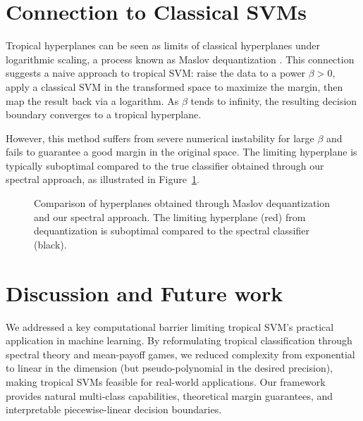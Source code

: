 \documentclass{article}
\begin{document}
\newpage
\section{Connection to Classical SVMs}\label{sec:maslov}
Tropical hyperplanes can be seen as limits of classical hyperplanes under logarithmic scaling, a process known as Maslov dequantization \cite{viro2001}. This connection suggests a naive approach to tropical SVM: raise the data to a power $\beta > 0$, apply a classical SVM in the transformed space to maximize the margin, then map the result back via a logarithm. As $\beta$ tends to infinity, the resulting decision boundary converges to a tropical hyperplane.

However, this method suffers from severe numerical instability for large $\beta$ and fails to guarantee a good margin in the original space. The limiting hyperplane is typically suboptimal compared to the true classifier obtained through our spectral approach, as illustrated in Figure~\ref{fig:maslov_dequantization}.

\begin{figure}[h]
    \centering
    \resizebox{0.5\textwidth}{!}{\clipbox{0.15\width{} 0.15\height{} 0.15\width{} 0.15\height{}}{}}
    \caption{Comparison of hyperplanes obtained through Maslov dequantization and our spectral approach. The limiting hyperplane (red) from dequantization is suboptimal compared to the spectral classifier (black).}
    \label{fig:maslov_dequantization}
\end{figure}

\section{Discussion and Future work}\label{sec:discussion}

We addressed a key computational barrier limiting tropical SVM's practical application in machine learning. By reformulating tropical classification through spectral theory and mean-payoff games, we reduced complexity from exponential to linear in the dimension (but pseudo-polynomial in the desired precision),
making tropical SVMs feasible for real-world applications.
Our framework provides natural multi-class capabilities, theoretical margin guarantees, and interpretable piecewise-linear decision boundaries.
\end{document}
